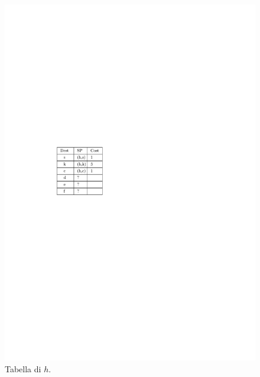 \documentclass[10pt,xcolor=dvipsnames]{beamer}
\begin{document}
\begin{frame}
\begin{figure}[h]
		\includegraphics[scale=0.7]{routing_table_local_initial_h.pdf}
		\caption*{Tabella di $h$.}
	\end{figure}
\end{frame}
\end{document}
